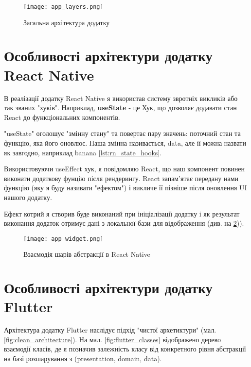 \begin{figure}
    \begin{center}
        \texttt{[image: app\_layers.png]}
        \caption{Загальна архітектура додатку}
        \label{fig:gen_app_architecture}
    \end{center}
\end{figure}

\section{Особливості архітектури додатку React Native}
\label{sec:kn_app_architecture}
В реалізації додатку React Native я використав систему звротніх викликів або так званих "хуків".
Наприклад, \textbf{useState} - це Хук, що дозволяє додавати стан React до функціональних компонентів.

"useState" оголошує "змінну стану" та повертає пару значень: поточний стан та функцію, яка його оновлює.
Наша змінна називається, data, але її можна назвати як завгодно, наприклад banana \ref{lst:rn_state_hooks}.

Використовуючи useEffect хук, я повідомляю React, що наш компонент повинен виконати додаткову фунцію після рендерингу.
React запам'ятає передану нами функцію (яку я буду називати "ефектом") і викличе її пізніше після оновлення UI нашого додатку.

Ефект котрий я створив буде виконаний при ініціалізації додатку
і як результат виконання додаток отримує дані з локальної бази для відображення (див. на \ref{fig:rn_realm})).

\begin{figure}
    \begin{center}
        \texttt{[image: app\_widget.png]}
        \caption{Взаємодія шарів абстракції в React Native}
        \label{fig:rn_realm}
    \end{center}
\end{figure}


\section{Особливості архітектури додатку Flutter}
\label{sec:flutter_network_app}

Архітектура додатку Flutter наслідує підхід "чистої архетиктури" (мал. \ref{fig:clean_architecture}).
На мал. \ref{fig:flutter_classes} відображено дерево взаємодії класів, де я позначив залежність класу
від конкретного рівня абстракції на базі розшарування з (presentation, domain, data).

